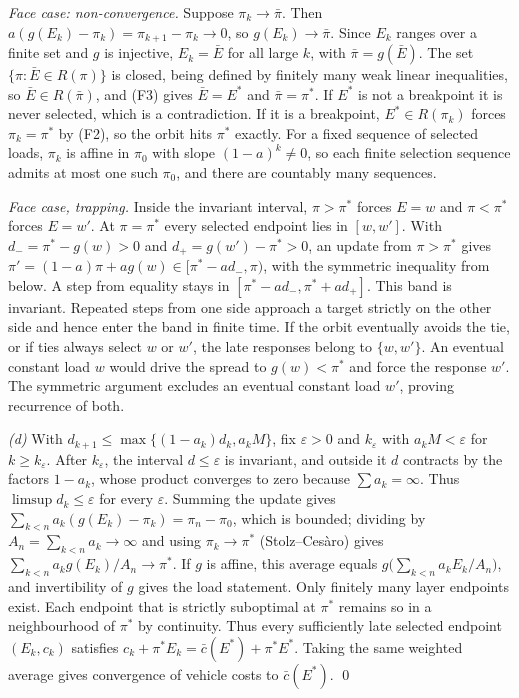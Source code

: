 \emph{Face case: non-convergence.} Suppose $\pi_k\to\bar\pi$. Then
$a(g(E_k)-\pi_k)=\pi_{k+1}-\pi_k\to0$, so $g(E_k)\to\bar\pi$. Since $E_k$ ranges over a
finite set and $g$ is injective, $E_k=\bar E$ for all large $k$, with
$\bar\pi=g(\bar E)$. The set $\{\pi:\bar E\in R(\pi)\}$ is closed, being defined by
finitely many weak linear inequalities, so $\bar E\in R(\bar\pi)$, and (F3) gives
$\bar E=E^*$ and $\bar\pi=\pi^*$. If $E^*$ is not a breakpoint it is never selected,
which is a contradiction. If it is a breakpoint, $E^*\in R(\pi_k)$ forces
$\pi_k=\pi^*$ by (F2), so the orbit hits $\pi^*$ exactly. For a fixed sequence of
selected loads, $\pi_k$ is affine in $\pi_0$ with slope $(1-a)^k\neq0$, so each
finite selection sequence admits at most one such $\pi_0$, and there are countably
many sequences.

\emph{Face case, trapping.} Inside the invariant interval, $\pi>\pi^*$
forces $E=w$ and $\pi<\pi^*$ forces $E=w'$. At $\pi=\pi^*$ every selected
endpoint lies in $[w,w']$. With
$d_-=\pi^*-g(w)>0$ and $d_+=g(w')-\pi^*>0$, an update from $\pi>\pi^*$ gives
$\pi'=(1-a)\pi+ag(w)\in[\pi^*-ad_-,\pi)$, with the symmetric inequality
from below. A step from equality stays in $[\pi^*-ad_-,\pi^*+ad_+]$. This
band is invariant. Repeated steps from one side approach a target strictly on
the other side and hence enter the band in finite time. If the orbit
eventually avoids the tie, or if ties always select $w$ or $w'$, the late
responses belong to $\{w,w'\}$. An eventual constant load $w$ would drive
the spread to $g(w)<\pi^*$ and force the response $w'$. The symmetric
argument excludes an eventual constant load $w'$, proving recurrence of both.

\emph{(d)} With $d_{k+1}\le\max\{(1-a_k)d_k,a_kM\}$, fix $\varepsilon>0$ and $k_\varepsilon$ with
$a_kM<\varepsilon$ for $k\ge k_\varepsilon$. After $k_\varepsilon$, the interval $d\le\varepsilon$ is invariant,
and outside it $d$ contracts by the factors $1-a_k$, whose product converges to
zero because $\sum a_k=\infty$. Thus $\limsup d_k\le\varepsilon$ for every
$\varepsilon$. Summing the update gives $\sum_{k<n}a_k(g(E_k)-\pi_k)=\pi_n-\pi_0$,
which is bounded; dividing by $A_n=\sum_{k<n}a_k\to\infty$ and using
$\pi_k\to\pi^*$ (Stolz--Ces\`aro) gives $\sum_{k<n}a_kg(E_k)/A_n\to\pi^*$. If $g$
is affine, this average equals $g\bigl(\sum_{k<n}a_kE_k/A_n\bigr)$, and invertibility
of $g$ gives the load statement. Only finitely many layer endpoints exist.
Each endpoint that is strictly suboptimal at $\pi^*$ remains so in a
neighbourhood of $\pi^*$ by continuity. Thus every sufficiently late
selected endpoint $(E_k,c_k)$ satisfies
$c_k+\pi^*E_k=\bar c(E^*)+\pi^*E^*$. Taking the same weighted average
gives convergence of vehicle costs to $\bar c(E^*)$. \qed

